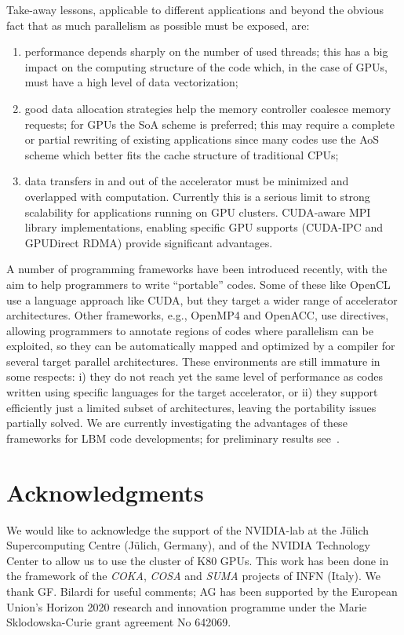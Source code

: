 \documentclass{elsarticle}
\newcommand{\benu}{\begin{enumerate}}
\newcommand{\eenu}{\end{enumerate}}
\begin{document}
Take-away lessons, applicable to different applications and beyond 
the obvious fact that as much parallelism as possible must be exposed, 
are:
\benu
\item performance depends sharply on the number of used threads; this has 
      a big impact on the computing structure of the code which, in the case of GPUs, must have a high level of data vectorization;  
%
\item good data allocation strategies help the memory controller 
      coalesce memory requests; for GPUs the 
      SoA scheme is preferred;
      this may require a complete or partial rewriting of existing
      applications since many codes use the AoS scheme 
      which better fits the cache structure of traditional CPUs;
%
\item data transfers in and out of the accelerator must be minimized and 
      overlapped with computation. Currently this is a serious 
      limit to strong scalability for applications running on GPU clusters.
      CUDA-aware MPI library implementations, enabling specific GPU supports
       (CUDA-IPC and GPUDirect RDMA) provide significant advantages. 
\eenu


A number of programming frameworks have been introduced recently, with the 
aim to help programmers to write ``portable'' codes. 
%
Some of these like OpenCL use a language approach like CUDA, but they 
target a wider range of accelerator architectures. 
%
Other frameworks, e.g., OpenMP4 and OpenACC, use directives, allowing programmers to annotate regions of codes where parallelism can be exploited, so they can be automatically mapped and optimized by a compiler for several target 
parallel architectures.
%
These environments are still immature in some respects: i) 
they do not reach yet the same level of performance as codes written 
using specific languages for the target accelerator, or ii) they support 
efficiently just a limited subset of architectures, leaving the portability 
issues partially solved.
%
We are currently investigating the advantages of these frameworks for LBM 
code developments; for preliminary results see~\cite{iccs14,europar14,europar15,jiri,cpe2016}.


\section*{Acknowledgments}
We would like to acknowledge the support of the NVIDIA-lab at 
the J\"ulich Supercomputing Centre (J\"ulich, Germany), and of 
the NVIDIA Technology Center to allow us to use the cluster of K80 GPUs.  
This work has been done in the framework of the {\em COKA}, {\em COSA} 
and {\em SUMA} projects of INFN (Italy). We thank GF. Bilardi for useful comments;
AG has been supported by the European Union's Horizon 2020 research and
innovation programme under the Marie Sklodowska-Curie grant agreement No 642069.
\end{document}
